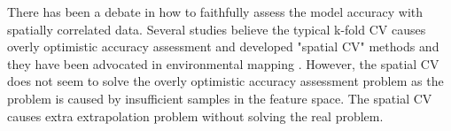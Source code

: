\documentclass{article}
\begin{document}

There has been a debate in how to faithfully assess the model accuracy with spatially correlated data. Several studies believe the typical k-fold CV causes overly optimistic accuracy assessment and developed "spatial CV" methods  \citep{brenning2012spatial,meyer2018improving} and they have been advocated in environmental mapping \citep{ploton2020spatial}. However, the spatial CV does not seem to solve the overly optimistic accuracy assessment problem as the problem is caused by insufficient samples in the feature space. The spatial CV causes extra extrapolation problem \citep{wadoux2021spatial} without solving the real problem.  

 
\end{document}
